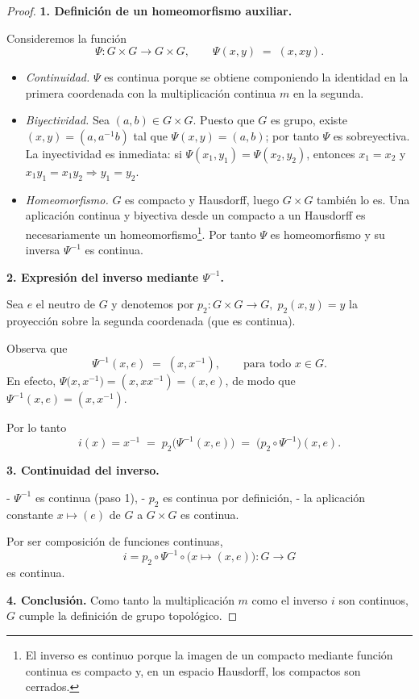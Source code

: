 \documentclass{article}
\begin{document}
\begin{proof}
\textbf{1. Definición de un homeomorfismo auxiliar.}

Consideremos la función
\[
\Psi : G\times G \longrightarrow G\times G,
\qquad
\Psi(x,y)\;=\;(x,xy).
\]

\begin{itemize}
\item \emph{Continuidad.}  
      $\Psi$ es continua porque se obtiene componiendo la identidad en la
      primera coordenada con la multiplicación continua \(m\) en la segunda.

\item \emph{Biyectividad.}  
      Sea \((a,b)\in G\times G\).
      Puesto que \(G\) es grupo,
      existe \((x,y)=(a,a^{-1}b)\) tal que
      \(\Psi(x,y)=(a,b)\); por tanto $\Psi$ es sobreyectiva.
      La inyectividad es inmediata: si \(\Psi(x_1,y_1)=\Psi(x_2,y_2)\), entonces
      \(x_1=x_2\) y \(x_1y_1=x_1y_2\Rightarrow y_1=y_2\).

\item \emph{Homeomorfismo.}  
      \(G\) es compacto y Hausdorff, luego
      \(G\times G\) también lo es.
      Una aplicación continua y biyectiva desde un compacto a un Hausdorff
      es necesariamente un homeomorfismo\footnote{%
      El inverso es continuo porque la imagen de un compacto
      mediante función continua es compacto y, en un espacio Hausdorff,
      los compactos son cerrados.}.
      Por tanto \(\Psi\) es homeomorfismo y su inversa
      \(\Psi^{-1}\) es continua.
\end{itemize}

\textbf{2. Expresión del inverso mediante \(\Psi^{-1}\).}

Sea \(e\) el neutro de \(G\) y denotemos
por \(p_2:G\times G\to G,\;p_2(x,y)=y\)
la proyección sobre la segunda coordenada
(que es continua).

Observa que
\[
\Psi^{-1}(x,e)\;=\;(x,x^{-1}),
\qquad\text{para todo }x\in G.
\]
En efecto,
\(\Psi\bigl(x,x^{-1}\bigr)=(x,xx^{-1})=(x,e)\), de modo que
\(\Psi^{-1}(x,e)=(x,x^{-1})\).

Por lo tanto
\[
i(x)=x^{-1}
      \;=\;
      p_2\!\bigl(\Psi^{-1}(x,e)\bigr)
      \;=\;
      \bigl(p_2\circ\Psi^{-1}\bigr)(x,e).
\]

\textbf{3. Continuidad del inverso.}

- \(\Psi^{-1}\) es continua (paso 1),
- \(p_2\) es continua por definición,
- la aplicación constante \(x\mapsto(e)\) de \(G\) a \(G\times G\)
  es continua.

Por ser composición de funciones continuas,
\[
i=p_2\circ\Psi^{-1}\circ\bigl(x\mapsto(x,e)\bigr):G\longrightarrow G
\]
es continua.

\textbf{4. Conclusión.}
Como tanto la multiplicación \(m\) como el inverso \(i\)
son continuos, \(G\) cumple la definición de grupo topológico.
\end{proof}
\end{document}
